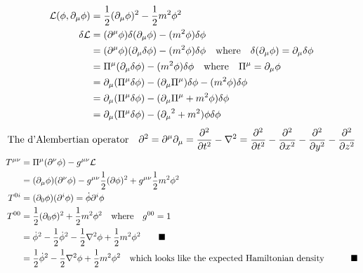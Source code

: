 \documentclass{article}
\begin{document}
\begin{align*}
  \mathcal{L}(\phi,\partial_\mu \phi) & =\frac{1}{2}(\partial_\mu \phi)^2-\frac{1}{2}m^2\phi^2                                                                        \\
  \delta\mathcal{L}                   & =(\partial^\mu \phi)\delta(\partial_\mu \phi)-(m^2 \phi)\delta\phi                                                            \\
                                      & =(\partial^\mu \phi)(\partial_\mu \delta\phi)-(m^2 \phi)\delta\phi\qq{where}\delta(\partial_\mu \phi)=\partial_\mu \delta\phi \\
                                      & =\Pi^\mu(\partial_\mu \delta\phi)-(m^2 \phi)\delta\phi\qq{where}\Pi^\mu=\partial_\mu \phi                                     \\
                                      & =\partial_\mu (\Pi^\mu \delta\phi)-(\partial_\mu \Pi^\mu) \delta\phi-(m^2 \phi)\delta\phi                                     \\
                                      & =\partial_\mu (\Pi^\mu \delta\phi)-(\partial_\mu \Pi^\mu+m^2 \phi)\delta\phi                                                  \\
                                      & =    \partial_\mu (\Pi^\mu \delta\phi)-({\partial_\mu}^2 +m^2 )\phi\delta\phi                                                 \\
\end{align*}
\begin{align*}
  \qq*{The d'Alembertian operator}\partial^2=\partial^\mu \partial_\mu=\pdv[2]{t}-\laplacian=\pdv[2]{t}-\pdv[2]{x}-\pdv[2]{y}-\pdv[2]{z}
\end{align*}
\begin{align*}
  T^{\mu\nu} & = \Pi^\mu (\partial^\nu \phi)-g^{\mu\nu}\mathcal{L}                                                                                                \\
             & = (\partial_\mu \phi) (\partial^\nu \phi)-g^{\mu\nu}\frac{1}{2}(\partial \phi)^2+g^{\mu\nu}\frac{1}{2}m^2\phi^2                                    \\
  T^{0i}     & = (\partial_0 \phi) (\partial^i \phi)=\dot{\phi}\partial^i \phi                                                                                    \\
  T^{00}     & =\frac{1}{2}(\partial_0 \phi)^2+\frac{1}{2}m^2\phi^2\qq{where}g^{00}=1                                                                             \\
             & =\dot{ \phi}^2-\frac{1}{2}\dot{ \phi}^2-\frac{1}{2}\laplacian\phi+\frac{1}{2}m^2\phi^2  \qquad\blacksquare                                         \\
             & =\frac{1}{2}\dot{ \phi}^2-\frac{1}{2}\laplacian\phi+\frac{1}{2}m^2\phi^2\qq{which looks like the expected Hamiltonian density}  \qquad\blacksquare \\
\end{align*}
\end{document}
